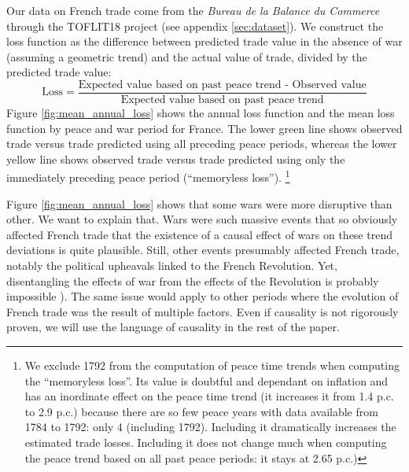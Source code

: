 \documentclass[12pt,a4paper,notitlepage,english]{article}
\begin{document}
\label{sec:loss}
Our data on French trade come from the \textit{Bureau de la Balance du Commerce} through the TOFLIT18 project (see appendix \ref{sec:dataset}).
We construct the loss function as the difference between predicted trade value in the absence of war (assuming a geometric trend) and the actual value of trade, divided by the predicted trade value:
\begin{equation}
\label{eqn:loss}
\text{Loss} = \frac{\text{Expected value based on past peace trend - Observed value}}{\text{Expected value based on past peace trend}}
\end{equation}
Figure \ref{fig:mean_annual_loss} shows the annual loss function and the mean loss function by peace and war period for France. 
The lower green line shows observed trade versus trade predicted using all preceding peace periods, whereas the lower yellow line shows observed trade versus trade predicted using only the immediately preceding peace period (``memoryless loss'').
\footnote{We exclude 1792 from the computation of peace time trends when computing the ``memoryless loss''. Its value is doubtful and dependant on inflation and has an inordinate effect on the peace time trend (it increases it from 1.4 p.c. to 2.9 p.c.) because there are so few peace years with data available from 1784 to 1792: only 4 (including 1792). Including it dramatically increases the estimated trade losses. Including it does not change much when computing the peace trend based on all past peace periods: it stays at 2.65 p.c.)}

Figure \ref{fig:mean_annual_loss} shows that some wars were more disruptive than other. 
We want to explain that.
Wars were such massive events that so obviously affected French trade that the existence of a causal effect of wars on these trend deviations is quite plausible.
Still, other events presumably affected French trade, notably the political upheavals linked to the French Revolution. 
Yet, disentangling the effects of war from the effects of the Revolution is probably impossible \citep{Charles2021}).
The same issue would apply to other periods where the evolution of French trade was the result of multiple factors.
Even if causality is not rigorously proven, we will use the language of causality in the rest of the paper.
\end{document}
